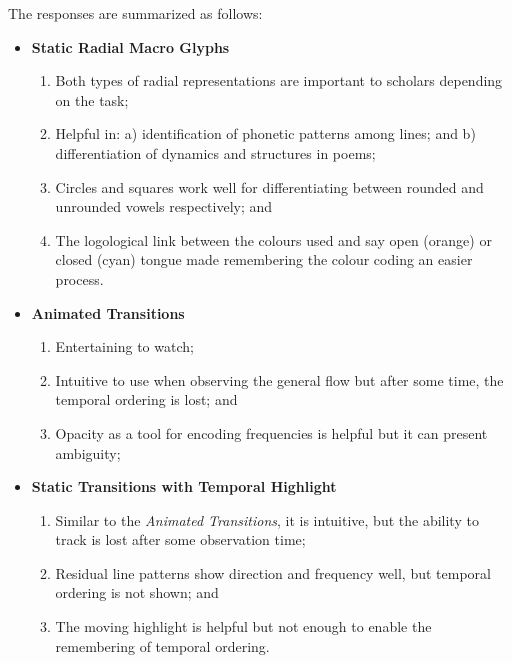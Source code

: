 The responses are summarized as follows:
\begin{itemize}
\item \textbf{Static Radial Macro Glyphs}
\vspace{-1mm}
\begin{enumerate}
\item Both types of radial representations are important to scholars depending on the task;
\vspace{-2mm}
\item Helpful in: a) identification of phonetic patterns among lines; and b) differentiation of dynamics and structures in poems;
\vspace{-2mm}
\item Circles and squares work well for differentiating between rounded and unrounded vowels respectively; and
\vspace{-2mm}
\item The logological link between the colours used and say open (orange) or closed (cyan) tongue made remembering the colour coding an easier process.
\end{enumerate}
\vspace{-2mm}
\item \textbf{Animated Transitions}
\vspace{-1mm}
\begin{enumerate}
\item Entertaining to watch;
\vspace{-2mm}
\item Intuitive to use when observing the general flow but after some time, the temporal ordering is lost; and
\vspace{-2mm}
\item Opacity as a tool for encoding frequencies is helpful but it can present ambiguity;
\end{enumerate}
\vspace{-2mm}
\item \textbf{Static Transitions with Temporal Highlight}
\vspace{-1mm}
\begin{enumerate}
\vspace{-2mm}
\item Similar to the \emph{Animated Transitions}, it is intuitive, but the ability to track is lost after some observation time;
\vspace{-2mm}
\item Residual line patterns show direction and frequency well, but temporal ordering is not shown; and
\vspace{-2mm}
\item The moving highlight is helpful but not enough to enable the remembering of temporal ordering.
\vspace{-2mm}
\end{enumerate}
\end{itemize}

